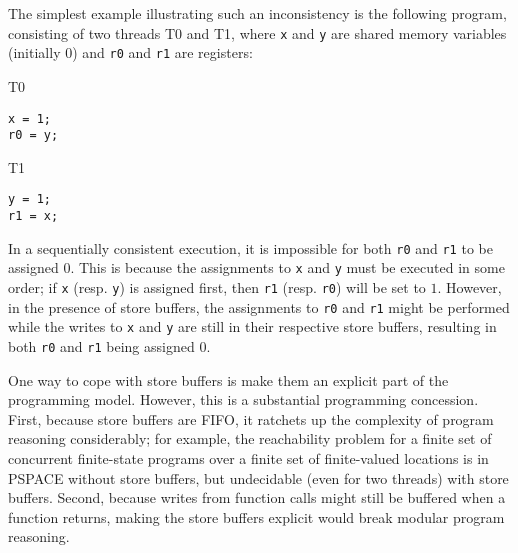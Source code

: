 \documentclass[11pt]{llncs}
\begin{document}
The simplest example illustrating such an inconsistency is the
following program, consisting of two threads T0 and T1, where
\texttt{x} and \texttt{y} are shared memory variables (initially 0)
and \texttt{r0} and \texttt{r1} are registers:
%
\begin{center}
\begin{minipage}{6cm}
\begin{multicols}{3}
T0
\begin{verbatim}
x = 1;
r0 = y;
\end{verbatim}

\columnbreak

T1
\begin{verbatim}
y = 1;
r1 = x;
\end{verbatim}
\columnbreak

\end{multicols}
\end{minipage}
\end{center}
%
In a sequentially consistent execution, it is impossible for both
\texttt{r0} and \texttt{r1} to be assigned $0$. This is because the
assignments to \texttt{x} and \texttt{y} must be executed in some
order; if \texttt{x} (resp. \texttt{y}) is assigned first, then
\texttt{r1} (resp. \texttt{r0}) will be set to $1$. However, in the
presence of store buffers, the assignments to \texttt{r0} and
\texttt{r1} might be performed while the writes to \texttt{x} and
\texttt{y} are still in their respective store buffers, resulting in
both \texttt{r0} and \texttt{r1} being assigned $0$.

One way to cope with store buffers is make them an explicit part of
the programming model. However, this is a substantial programming
concession. First, because store buffers are FIFO, it ratchets up the
complexity of program reasoning considerably; for example, the
reachability problem for a finite set of concurrent finite-state
programs over a finite set of finite-valued locations is in PSPACE
without store buffers, but undecidable (even for two threads) with
store buffers. Second, because writes from function calls might still
be buffered when a function returns, making the store buffers explicit
would break modular program reasoning.
\end{document}
